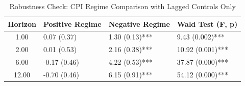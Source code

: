 \begin{table}[ht]
\centering
\caption{Robustness Check: CPI Regime Comparison with Lagged Controls Only} 
\label{tab:robust_regime_cpi}
\begin{tabular}{clll}
  \toprule
Horizon & Positive Regime & Negative Regime & Wald Test (F, p) \\ 
  \midrule
1.00 & 0.07 (0.37) & 1.30 (0.13)*** & 9.43 (0.002)*** \\ 
  2.00 & 0.01 (0.53) & 2.16 (0.38)*** & 10.92 (0.001)*** \\ 
  6.00 & -0.17 (0.46) & 4.22 (0.53)*** & 37.87 (0.000)*** \\ 
  12.00 & -0.70 (0.46) & 6.15 (0.91)*** & 54.12 (0.000)*** \\ 
   \bottomrule
\end{tabular}
\end{table}
